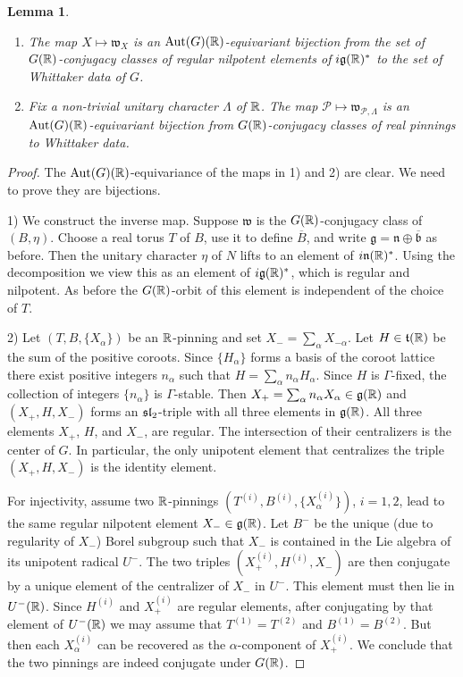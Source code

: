 \documentclass{article}
\newtheorem{lem}[thm]{Lemma}
\theoremstyle{definition}
\numberwithin{equation}{section}
\renewcommand{\-}{\hyp{}}
\newcommand{\n}{\mathfrak n}
\newcommand{\g}{\mathfrak g}
\renewcommand{\P}{\mathcal P}
\newcommand{\w}{\mathfrak w}
\begin{document}
\begin{lem} \label{lem:w1}
\begin{enumerate}
\item The map $X \mapsto \w_X$ is an $\textrm{Aut}(G)(\mathbb{R})$-equivariant bijection from the set of $G(\mathbb{R})$-conjugacy classes of regular nilpotent elements of $i\g(\R)^*$ to the set of Whittaker data of $G$.
\item Fix a non-trivial unitary character $\Lambda$ of $\mathbb{R}$. The map $\P\mapsto \w_{\P,\Lambda}$ is an $\textrm{Aut}(G)(\mathbb{R})$-equivariant bijection from $G(\mathbb{R})$-conjugacy classes of real pinnings to Whittaker data.
\end{enumerate}
\end{lem}
\begin{proof}

The $\textrm{Aut}(G)(\mathbb{R})$-equivariance of the maps in 1) and  2) are clear. We need to prove they are bijections.

1) We construct the inverse map.  Suppose $\w$ is the $G(\mathbb{R})$-conjugacy class of
$(B,\eta)$. Choose a real torus $T$ of $B$, use it to define
$\overline B$, and write $\g=\n\oplus \overline{\mathfrak b}$ as 
before. Then the unitary character $\eta$ of $N$ lifts to an element
of $i\n(\R)^*$. Using the decomposition we view this as an element of
$i\g(\R)^*$, which is regular and nilpotent. As before the $G(\mathbb{R})$-orbit of
this element is independent of the choice of $T$.

2) Let $(T,B,\{X_\alpha\})$ be an $\mathbb{R}$-pinning and set
$X_-=\sum_\alpha X_{-\alpha}$. Let $H \in \mathfrak{t}(\mathbb{R})$ be the sum of
the positive coroots. Since $\{H_\alpha\}$ forms a basis of the coroot
lattice there exist positive integers $n_\alpha$ such that
$H=\sum_\alpha n_\alpha H_\alpha$. Since $H$ is $\Gamma$-fixed, the
collection of integers $\{n_\alpha\}$ is $\Gamma$-stable. Then
$X_+=\sum_\alpha n_\alpha X_\alpha \in \mathfrak{g}(\mathbb{R})$ and $(X_+,H,X_-)$
forms an $\mathfrak{sl}_2$-triple with all three elements in
$\mathfrak{g}(\mathbb{R})$. All three elements $X_+$, $H$, and $X_-$, are
regular. The intersection of their centralizers is the center of
$G$. In particular, the only unipotent element that centralizes the
triple $(X_+,H,X_-)$ is the identity element.


For injectivity, assume two $\mathbb{R}$-pinnings
$(T^{(i)},B^{(i)},\{X_\alpha^{(i)}\})$, $i=1,2$, lead to the same
regular nilpotent element $X_- \in \mathfrak{g}(\mathbb{R})$. Let $B^-$ be the
unique (due to regularity of $X_-$) Borel subgroup such that $X_-$ is
contained in the Lie algebra of its unipotent radical $U^-$. The two
triples $(X_+^{(i)},H^{(i)},X_-)$ are then conjugate by a unique
element of the centralizer of $X_-$ in $U^-$. This element must then
lie in $U^-(\mathbb{R})$. Since $H^{(i)}$ and $X_+^{(i)}$ are regular
elements, after conjugating by that element of $U^-(\mathbb{R})$ we may assume
that $T^{(1)}=T^{(2)}$ and $B^{(1)}=B^{(2)}$. But then each
$X_\alpha^{(i)}$ can be recovered as the $\alpha$-component of
$X_+^{(i)}$. We conclude that the two pinnings are indeed conjugate
under $G(\mathbb{R})$.


\end{proof}
\end{document}
